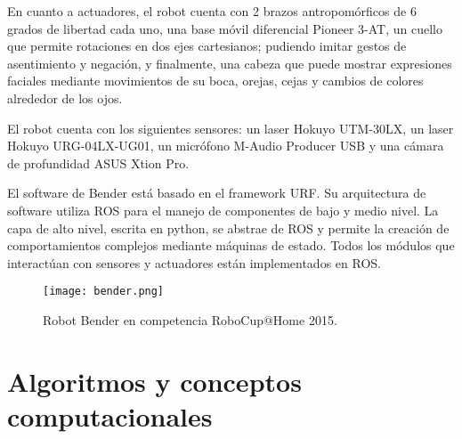 En cuanto a actuadores, el robot cuenta con 2 brazos antropomórficos de 6 grados de libertad cada uno, una base móvil diferencial Pioneer 3-AT, un cuello que permite rotaciones en dos ejes cartesianos; pudiendo imitar gestos de asentimiento y negación, y finalmente, una cabeza que puede mostrar expresiones faciales mediante movimientos de su boca, orejas, cejas y cambios de colores alrededor de los ojos.

El robot cuenta con los siguientes sensores: un laser Hokuyo UTM-30LX, un laser Hokuyo URG-04LX-UG01, un micrófono M-Audio Producer USB y una cámara de profundidad ASUS Xtion Pro.

El software de Bender está basado en el framework URF. Su arquitectura de software utiliza  ROS para el manejo de componentes de bajo y medio nivel. La capa de alto nivel, escrita en python, se abstrae de ROS y permite la creación de comportamientos complejos mediante máquinas de estado. Todos los módulos que interactúan con sensores y actuadores están implementados en ROS.

\begin{figure}[!h]
	\centering
	\texttt{[image: bender.png]}
	\caption{\small Robot Bender en competencia RoboCup@Home 2015.}
	\label{img:bender}
\end{figure}









\section{Algoritmos y conceptos computacionales}



